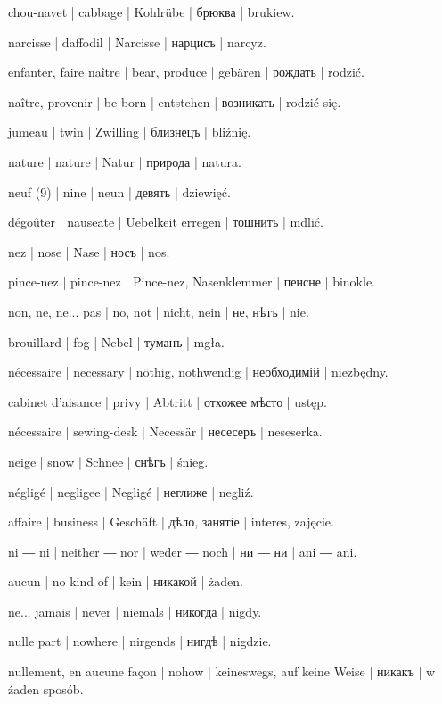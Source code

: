 \begin{outdent}{1em}
chou-navet | cabbage | Kohlrübe | брюква | brukiew.

narcisse | daffodil | Narcisse | нарцисъ | narcyz.

enfanter, faire naître | bear, produce | gebären | рождать | rodzić.

\uvsubentry{}
naître, provenir | be born | entstehen | возникать | rodzić się.


\uvsubentry{}
jumeau | twin | Zwilling | близнецъ | bliźnię.

nature | nature | Natur | природа | natura.

neuf (9) | nine | neun | девять | dziewięć.

dégoûter | nauseate | Uebelkeit erregen | тошнить | mdlić.

nez | nose | Nase | носъ | nos.

\uvsubentry{}
pince-nez | pince-nez | Pince-nez, Nasenklemmer | пенсне | binokle.

non, ne, ne... pas | no, not | nicht, nein | не, нѣтъ | nie.

brouillard | fog | Nebel | туманъ | mgła.

nécessaire | necessary | nöthig, nothwendig | необходимій | niezbędny.

\uvsubentry{}
cabinet d’aisance | privy | Abtritt | отхожее мѣсто | ustęp.


\uvsubentry{}
nécessaire | sewing-desk | Necessär | несесеръ | neseserka.

neige | snow | Schnee | снѣгъ | śnieg.

négligé | negligee | Negligé | неглиже | negliź.

affaire | business | Geschäft | дѣло, занятіе | interes,
zajęcie.

ni ― ni | neither ― nor | weder ― noch | ни ― ни | ani ― ani.

aucun | no kind of | kein | никакой | żaden.

ne... jamais | never | niemals | никогда | nigdy.

nulle part | nowhere | nirgends | нигдѣ | nigdzie.

nullement, en aucune façon | nohow | keineswegs, auf keine
Weise | никакъ | w źaden sposób.


\end{outdent}
